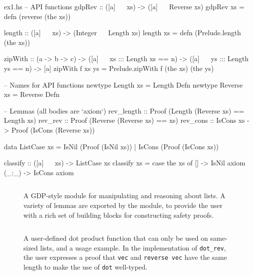 \documentclass[format=sigplan, review=false, screen=true]{acmart}
\begin{document}
\begin{filecontents*}{ex1.hs}
-- API functions
gdpRev :: ([a] ~~ xs) -> ([a] ~~ Reverse xs)
gdpRev xs = defn (reverse (the xs))

length :: ([a] ~~ xs) -> (Integer ~~ Length xs)
length xs = defn (Prelude.length (the xs))

zipWith :: (a -> b -> c)
         -> ([a] ~~ xs ::: Length xs == n)
         -> ([a] ~~ ys ::: Length ys == n)
         -> [a]
zipWith f xs ys = Prelude.zipWith f (the xs) (the ys)

-- Names for API functions
newtype Length  xs = Length  Defn
newtype Reverse xs = Reverse Defn

-- Lemmas (all bodies are `axiom`)
rev_length :: Proof (Length (Reverse xs) == Length xs)
rev_rev    :: Proof (Reverse (Reverse xs) == xs)
rev_cons   :: IsCons xs -> Proof (IsCons (Reverse xs))

data ListCase xs = IsNil  (Proof (IsNil  xs))
                 | IsCons (Proof (IsCons xs)) 

classify :: ([a] ~~ xs) -> ListCase xs
classify xs = case the xs of
  []    -> IsNil  axiom
  (_:_) -> IsCons axiom
\end{filecontents*}


\begin{figure}
    \inputminted{haskell}{ex1.hs}
    \caption{A GDP-style module for manipulating and reasoning about lists.
      A variety of lemmas are exported by the module, to provide the
      user with a rich set of building blocks for constructing safety proofs.
       \label{lemma-demo}}
\end{figure}
\begin{figure}
    \inputminted{haskell}{ex2.hs}
    \caption{A user-defined dot product function that can only be used on same-sized lists,
      and a usage example. In the implementation of \texttt{dot\_rev}, the user expresses a proof that
      \texttt{vec} and \texttt{reverse vec} have the same length to make the use of \texttt{dot}
       well-typed.\label{dot-product}}
\end{figure}
\end{document}
